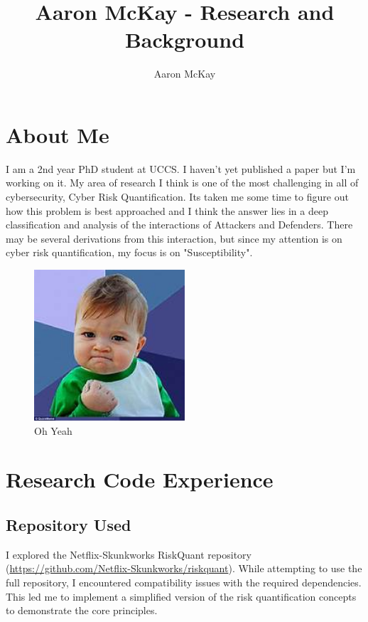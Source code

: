 \documentclass{article}
\begin{document}
\title{Aaron McKay - Research and Background}
\author{Aaron McKay}
\maketitle

\section{About Me}
I am a 2nd year PhD student at UCCS.  I haven't yet published a paper but I'm working on it.  My area of research I think is one of the most challenging in all of cybersecurity, Cyber Risk Quantification.  Its taken me some time to figure out how this problem is best approached and I think the answer lies in a deep classification and analysis of the interactions of Attackers and Defenders. There may be several derivations from this interaction, but since my attention is on cyber risk quantification, my focus is on "Susceptibility". 

\begin{figure}[h]
    \centering
    \includegraphics[width=0.5\textwidth]{images/Oh_Yeah.jpg}
    \caption{Oh Yeah}
    \label{fig:oh-yeah}
\end{figure}

\section{Research Code Experience}
\subsection{Repository Used}
I explored the Netflix-Skunkworks RiskQuant repository 
(\url{https://github.com/Netflix-Skunkworks/riskquant}). While attempting to use 
the full repository, I encountered compatibility issues with the required dependencies. 
This led me to implement a simplified version of the risk quantification concepts 
to demonstrate the core principles.
\end{document}
